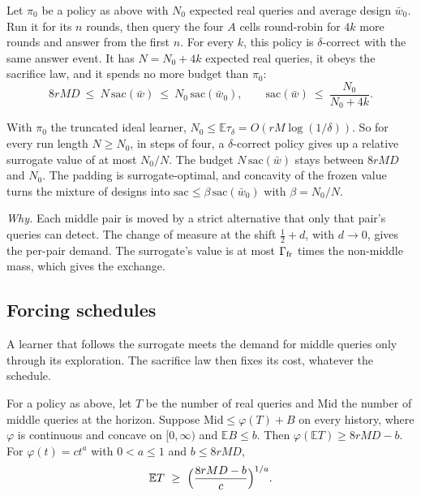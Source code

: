 \begin{theorem}
\label{thm:dilute}
Let $\pi_{0}$ be a policy as above with $N_{0}$ expected real queries and average design
$\bar w_{0}$. Run it for its $n$ rounds, then query the four $A$ cells round-robin for $4k$ more
rounds and answer from the first $n$. For every $k$, this policy is $\delta$-correct with the same
answer event. It has $N=N_{0}+4k$ expected real queries, it obeys the sacrifice law, and it spends
no more budget than $\pi_{0}$:
\[
8rMD\ \le\ N\,\mathrm{sac}(\bar w)\ \le\ N_{0}\,\mathrm{sac}(\bar w_{0}),\qquad
\mathrm{sac}(\bar w)\ \le\ \frac{N_{0}}{N_{0}+4k}.
\]
\end{theorem}


With $\pi_{0}$ the truncated ideal learner, $N_{0}\le\mathbb{E}\tau_{\delta}
=O(rM\log(1/\delta))$. So for every run length $N\ge N_{0}$, in steps of four, a
$\delta$-correct policy gives up a relative surrogate value of at most $N_{0}/N$. The budget
$N\,\mathrm{sac}(\bar w)$ stays between $8rMD$ and $N_{0}$. The padding is surrogate-optimal, and
concavity of the frozen value turns the mixture of designs into
$\mathrm{sac}\le\beta\,\mathrm{sac}(\bar w_{0})$ with $\beta=N_{0}/N$.

\emph{Why.} Each middle pair is moved by a strict alternative that only that pair's queries can
detect. The change of measure at the shift $\frac12+d$, with $d\to0$, gives the per-pair demand.
The surrogate's value is at most $\Gamma_{\rm fr}$ times the non-middle mass, which gives the
exchange.

\subsection{Forcing schedules}

A learner that follows the surrogate meets the demand for middle queries only through its
exploration. The sacrifice law then fixes its cost, whatever the schedule.

\begin{theorem}
\label{thm:forcing}
For a policy as above, let $T$ be the number of real queries and $\mathrm{Mid}$ the number of
middle queries at the horizon. Suppose $\mathrm{Mid}\le\varphi(T)+B$ on every history, where
$\varphi$ is continuous and concave on $[0,\infty)$ and $\mathbb{E}B\le b$. Then
$\varphi(\mathbb{E}T)\ge8rMD-b$. For $\varphi(t)=ct^{a}$ with $0<a\le1$ and
$b\le 8rMD$,
\[
\mathbb{E}T\ \ge\ \Bigl(\frac{8rMD-b}{c}\Bigr)^{1/a}.
\]
\end{theorem}

